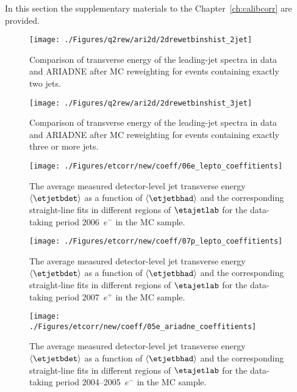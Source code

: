 In this section the supplementary materials to the Chapter~\ref{ch:calibcorr} are provided.

\begin{figure}[p]%
\texttt{[image: ./Figures/q2rew/ari2d/2drewetbinshist\_2jet]}%
\caption{Comparison of transverse energy of the leading-jet spectra in data
and ARIADNE after MC reweighting for events containing exactly two jets.}%
\label{fig:2dq2rew_et_2jet}%
\end{figure}

\begin{figure}[p]%
\texttt{[image: ./Figures/q2rew/ari2d/2drewetbinshist\_3jet]}%
\caption{Comparison of transverse energy of the leading-jet spectra in data
and ARIADNE after MC reweighting for events containing exactly three or more jets.}%
\label{fig:2dq2rew_et_3jet}%
\end{figure}

\begin{figure}[p]
\centering
\texttt{[image: ./Figures/etcorr/new/coeff/06e\_lepto\_coeffitients]}
\caption{The average measured detector-level jet transverse energy $\left\langle\etjetbdet\right\rangle$ as a function of $\left\langle\etjetbhad\right\rangle$ and the corresponding straight-line fits in different regions of $\etajetlab$ for the data-taking period 2006~$e^-$ in the \lepto MC sample.}
\label{fig:05e_lepto_coeffitients}
\end{figure}

\begin{figure}[p]
\centering
\texttt{[image: ./Figures/etcorr/new/coeff/07p\_lepto\_coeffitients]}
\caption{The average measured detector-level jet transverse energy $\left\langle\etjetbdet\right\rangle$ as a function of $\left\langle\etjetbhad\right\rangle$ and the corresponding straight-line fits in different regions of $\etajetlab$ for the data-taking period 2007~$e^+$ in the \lepto MC sample.}
\label{fig:05e_lepto_coeffitients}
\end{figure}

\begin{figure}[p]
\centering
\texttt{[image: ./Figures/etcorr/new/coeff/05e\_ariadne\_coeffitients]}
\caption{The average measured detector-level jet transverse energy $\left\langle\etjetbdet\right\rangle$ as a function of $\left\langle\etjetbhad\right\rangle$ and the corresponding straight-line fits in different regions of $\etajetlab$ for the data-taking period 2004--2005~$e^-$ in the \ariadne MC sample.}
\label{fig:05e_lepto_coeffitients}
\end{figure}

